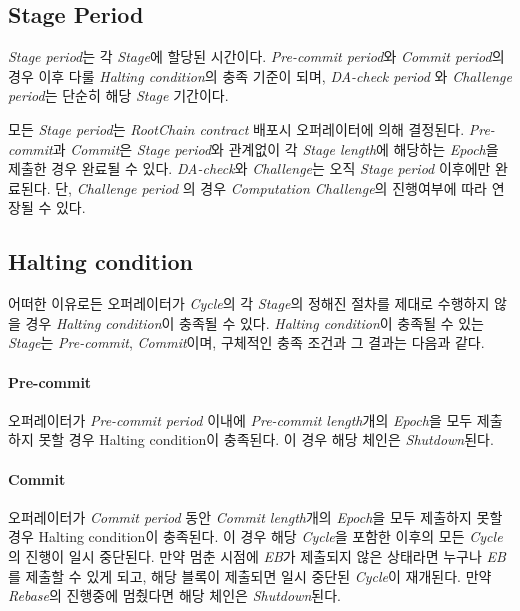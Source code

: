 \documentclass[letterpaper, 11pt]{article}
\begin{document}
\subsection{Stage Period}
\begin{CJK}{UTF8}{mj}
\emph{Stage period}는 각 \emph{Stage}에 할당된 시간이다. \emph{Pre-commit period}와 \emph{Commit period}의 경우 이후 다룰 \emph{Halting condition}의 충족 기준이 되며, \emph{DA-check period} 와 \emph{Challenge period}는 단순히 해당 \emph{Stage} 기간이다.

모든 \emph{Stage period}는 \emph{RootChain contract} 배포시 오퍼레이터에 의해 결정된다. \emph{Pre-commit}과 \emph{Commit}은 \emph{Stage period}와 관계없이 각 \emph{Stage length}에 해당하는 \emph{Epoch}을 제출한 경우 완료될 수 있다. \emph{DA-check}와 \emph{Challenge}는 오직 \emph{Stage period} 이후에만 완료된다. 단, \emph{Challenge period} 의 경우 \emph{Computation Challenge}의 진행여부에 따라 연장될 수 있다.
\end{CJK}

\subsection{Halting condition}
\begin{CJK}{UTF8}{mj}
어떠한 이유로든 오퍼레이터가 \emph{Cycle}의 각 \emph{Stage}의 정해진 절차를 제대로 수행하지 않을 경우 \emph{Halting condition}이 충족될 수 있다. \emph{Halting condition}이 충족될 수 있는 \emph{Stage}는 \emph{Pre-commit}, \emph{Commit}이며, 구체적인 충족 조건과 그 결과는 다음과 같다.
\end{CJK}

\paragraph{Pre-commit}
\begin{CJK}{UTF8}{mj}
오퍼레이터가 \emph{Pre-commit period} 이내에 \emph{Pre-commit length}개의 \emph{Epoch}을 모두 제출하지 못할 경우 Halting condition이 충족된다. 이 경우 해당 체인은 \emph{Shutdown}된다.
\end{CJK}

\paragraph{Commit}
\begin{CJK}{UTF8}{mj}
오퍼레이터가 \emph{Commit period} 동안 \emph{Commit length}개의 \emph{Epoch}을 모두 제출하지 못할 경우 Halting condition이 충족된다. 이 경우 해당 \emph{Cycle}을 포함한 이후의 모든 \emph{Cycle}의 진행이 일시 중단된다. 만약 멈춘 시점에 \emph{EB}가 제출되지 않은 상태라면 누구나 \emph{EB}를 제출할 수 있게 되고, 해당 블록이 제출되면 일시 중단된 \emph{Cycle}이 재개된다. 만약 \emph{Rebase}의 진행중에 멈췄다면 해당 체인은 \emph{Shutdown}된다.
\end{CJK}
\end{document}
